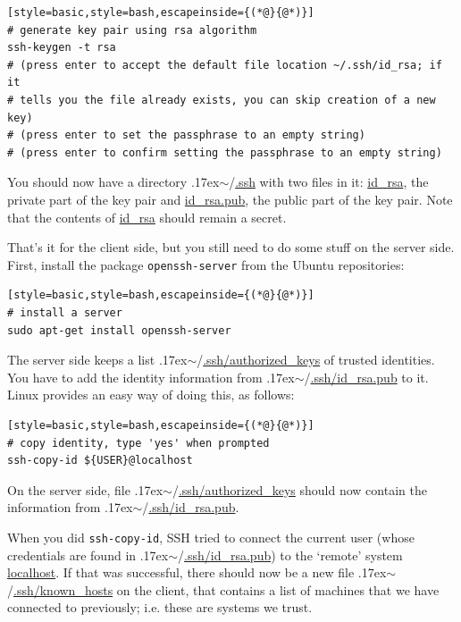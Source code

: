 \documentclass[12pt, a4paper, twoside, openany, titlepage]{book}
\newcommand{\mytilde}{\raise.17ex\hbox{$\scriptstyle\sim$}}
\begin{document}
\begin{lstlisting}[style=basic,style=bash,escapeinside={(*@}{@*)}]
# generate key pair using rsa algorithm
ssh-keygen -t rsa
# (press enter to accept the default file location ~/.ssh/id_rsa; if it
# tells you the file already exists, you can skip creation of a new key)
# (press enter to set the passphrase to an empty string)
# (press enter to confirm setting the passphrase to an empty string)
\end{lstlisting}

You should now have a directory \mytilde/\url{.ssh} with two files in it: \url{id_rsa},  the private part of the key pair and \url{id_rsa.pub}, the public part of the key pair. Note that the contents of \url{id_rsa} should remain a secret.

That's it for the client side, but you still need to do some stuff on the server side. First, install the package \texttt{openssh-server} from the Ubuntu repositories:
\begin{lstlisting}[style=basic,style=bash,escapeinside={(*@}{@*)}]
# install a server
sudo apt-get install openssh-server
\end{lstlisting} %

The server side keeps a list \mytilde/\url{.ssh/authorized_keys} of trusted identities. You have to add the identity information from \mytilde/\url{.ssh/id_rsa.pub} to it. Linux provides an easy way of doing this, as follows:
\begin{lstlisting}[style=basic,style=bash,escapeinside={(*@}{@*)}]
# copy identity, type 'yes' when prompted
ssh-copy-id ${USER}@localhost
\end{lstlisting} %

On the server side, file \mytilde/\url{.ssh/authorized_keys} should now contain the information from \mytilde/\mbox{\url{.ssh/id_rsa.pub}}.



When you did \texttt{ssh-copy-id}, SSH tried to connect the current user (whose credentials are found in \mytilde/\url{.ssh/id_rsa.pub}) to the `remote' system \url{localhost}. If that was successful, there should now be a new file \mytilde/\url{.ssh/known_hosts} on the client, that contains a list of machines that we have connected to previously; i.e. these are systems we trust.
\end{document}
